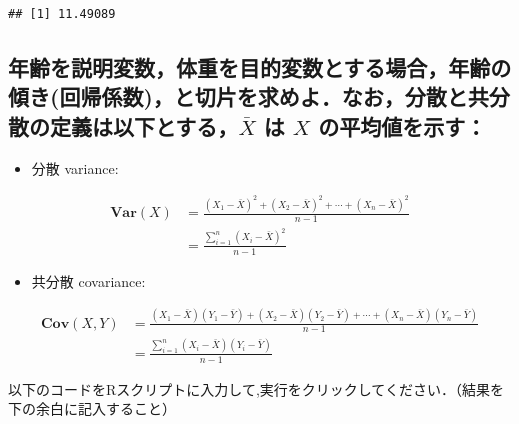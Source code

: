 \documentclass[11pt,]{problemset}
\newenvironment{Shaded}{\begin{snugshade}}{\end{snugshade}}
\newcommand{\CommentTok}[1]{\textcolor[rgb]{0.56,0.35,0.01}{\textit{#1}}}
\newcommand{\KeywordTok}[1]{\textcolor[rgb]{0.13,0.29,0.53}{\textbf{#1}}}
\newcommand{\NormalTok}[1]{#1}
\newcommand{\OperatorTok}[1]{\textcolor[rgb]{0.81,0.36,0.00}{\textbf{#1}}}
\newcommand{\StringTok}[1]{\textcolor[rgb]{0.31,0.60,0.02}{#1}}
\providecommand{\tightlist}{%
  \setlength{\itemsep}{0pt}\setlength{\parskip}{0pt}}
\begin{document}
\begin{verbatim}
## [1] 11.49089
\end{verbatim}

\hypertarget{barx--x-}{%
\subsection{\texorpdfstring{年齢を説明変数，体重を目的変数とする場合，年齢の傾き(回帰係数)，と切片を求めよ．なお，分散と共分散の定義は以下とする，\(\bar{X}\)
は \(X\)
の平均値を示す：}{年齢を説明変数，体重を目的変数とする場合，年齢の傾き(回帰係数)，と切片を求めよ．なお，分散と共分散の定義は以下とする，\textbackslash{}bar\{X\} は X の平均値を示す：}}\label{barx--x-}}

\begin{itemize}
\tightlist
\item
  分散 variance:
\end{itemize}

\[
\begin{aligned}
\mathbf{Var}(X) & = \frac{(X_1-\bar{X})^2+(X_2-\bar{X})^2+\cdots+(X_n-\bar{X})^2}{n - 1} \\
                & = \frac{\sum_{i=1}^n(X_i-\bar{X})^2}{n -1}
\end{aligned}
\]

\begin{itemize}
\tightlist
\item
  共分散 covariance:
\end{itemize}

\[
\begin{aligned}
\mathbf{Cov}(X, Y) & = \frac{(X_1 - \bar{X})(Y_1-\bar{Y}) + (X_2 - \bar{X})(Y_2-\bar{Y}) + \cdots + (X_n - \bar{X})(Y_n-\bar{Y})}{n - 1} \\
                   & = \frac{\sum_{i = 1}^n(X_i - \bar{X})(Y_i-\bar{Y})}{n - 1}
\end{aligned}
\]

以下のコードをRスクリプトに入力して,実行をクリックしてください．（結果を下の余白に記入すること）

\begin{Shaded}
\end{Shaded}
\end{document}
